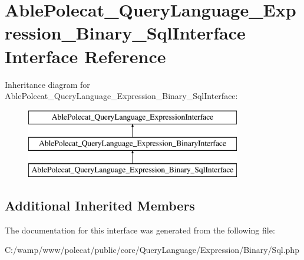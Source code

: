 \hypertarget{interface_able_polecat___query_language___expression___binary___sql_interface}{}\section{Able\+Polecat\+\_\+\+Query\+Language\+\_\+\+Expression\+\_\+\+Binary\+\_\+\+Sql\+Interface Interface Reference}
\label{interface_able_polecat___query_language___expression___binary___sql_interface}
Inheritance diagram for Able\+Polecat\+\_\+\+Query\+Language\+\_\+\+Expression\+\_\+\+Binary\+\_\+\+Sql\+Interface\+:\begin{figure}[H]
\begin{center}
\leavevmode
\includegraphics[height=3.000000cm]{interface_able_polecat___query_language___expression___binary___sql_interface}
\end{center}
\end{figure}
\subsection*{Additional Inherited Members}


The documentation for this interface was generated from the following file\+:\begin{DoxyCompactItemize}
\item 
C\+:/wamp/www/polecat/public/core/\+Query\+Language/\+Expression/\+Binary/Sql.\+php\end{DoxyCompactItemize}
